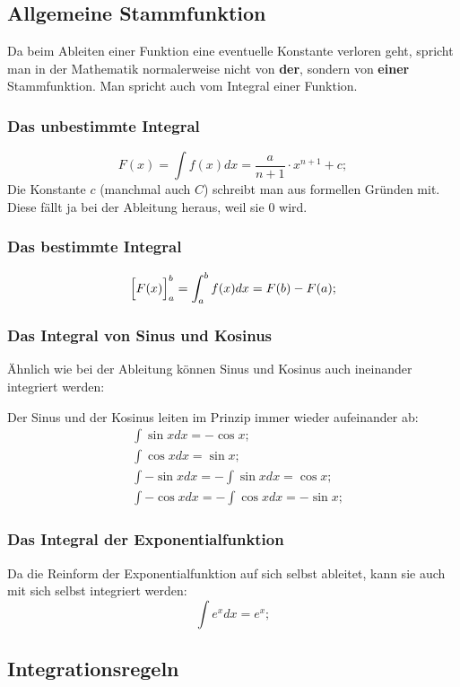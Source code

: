 \documentclass[a4paper]{article}
\begin{document}
\subsection{Allgemeine Stammfunktion}
Da beim Ableiten einer Funktion eine eventuelle Konstante verloren geht, spricht man in der Mathematik normalerweise nicht von \textbf{der}, sondern von \textbf{einer} Stammfunktion. Man spricht auch vom Integral einer Funktion.

\subsubsection{Das unbestimmte Integral}
\[
	F(x) = \int f(x) dx = \frac{a}{n + 1} \cdot x ^ {n + 1} + c;
\]
Die Konstante $c$ (manchmal auch $C$) schreibt man aus formellen Gründen mit. Diese fällt ja bei der Ableitung heraus, weil sie $0$ wird.

\subsubsection{Das bestimmte Integral}
\[
	\Bigl[ F(x) \Bigr]_{a}^{b} = \int_{a}^{b} f(x) dx = F(b) - F(a) ;
\]

\subsubsection{Das Integral von Sinus und Kosinus}
Ähnlich wie bei der Ableitung können Sinus und Kosinus auch ineinander integriert werden:

Der Sinus und der Kosinus leiten im Prinzip immer wieder aufeinander ab:
\begin{align*}
	& \int \sin{x} dx = -\cos{x} ;
	\\
	& \int \cos{x} dx = \sin{x} ;
	\\
	& \int -\sin{x} dx = - \int \sin{x} dx = \cos{x} ;
	\\
	& \int -\cos{x} dx = - \int \cos{x} dx = -\sin{x} ;
\end{align*}

\subsubsection{Das Integral der Exponentialfunktion}
Da die Reinform der Exponentialfunktion auf sich selbst ableitet, kann sie auch mit sich selbst integriert werden:
\[
	\int e^x dx = e^x ;
\]

\subsection{Integrationsregeln}
\end{document}
